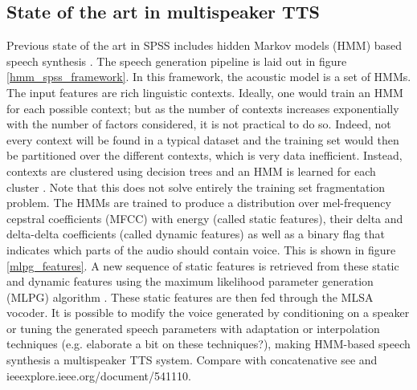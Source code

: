 \documentclass[a4paper, oneside]{article}
\begin{document}
\subsection{State of the art in multispeaker TTS}
Previous state of the art in SPSS includes hidden Markov models (HMM) based speech synthesis \citep{Tokuda-2013}. The speech generation pipeline is laid out in figure \ref{hmm_spss_framework}. In this framework, the acoustic model is a set of HMMs. The input features are rich linguistic contexts. Ideally, one would train an HMM for each possible context; but as the number of contexts increases exponentially with the number of factors considered, it is not practical to do so. Indeed, not every context will be found in a typical dataset and the training set would then be partitioned over the different contexts, which is very data inefficient. Instead, contexts are clustered using decision trees and an HMM is learned for each cluster \citep{HMMTTS}. Note that this does not solve entirely the training set fragmentation problem. The HMMs are trained to produce a distribution over mel-frequency cepstral coefficients (MFCC) with energy (called static features), their delta and delta-delta coefficients (called dynamic features) as well as a binary flag that indicates which parts of the audio should contain voice. This is shown in figure \ref{mlpg_features}. A new sequence of static features is retrieved from these static and dynamic features using the maximum likelihood parameter generation (MLPG) algorithm \citep{Tokuda-2000}. These static features are then fed through the MLSA \citep{MLSA} vocoder. It is possible to modify the voice generated by conditioning on a speaker or tuning the generated speech parameters with adaptation or interpolation techniques (e.g. \citep{HMMSpeakerInterpolation} \color{red} elaborate a bit on these techniques?\color{black}), making HMM-based speech synthesis a multispeaker TTS system. \color{red} Compare with concatenative see \citep{SPSSDNN} and ieeexplore.ieee.org/document/541110.\color{black}
\end{document}
